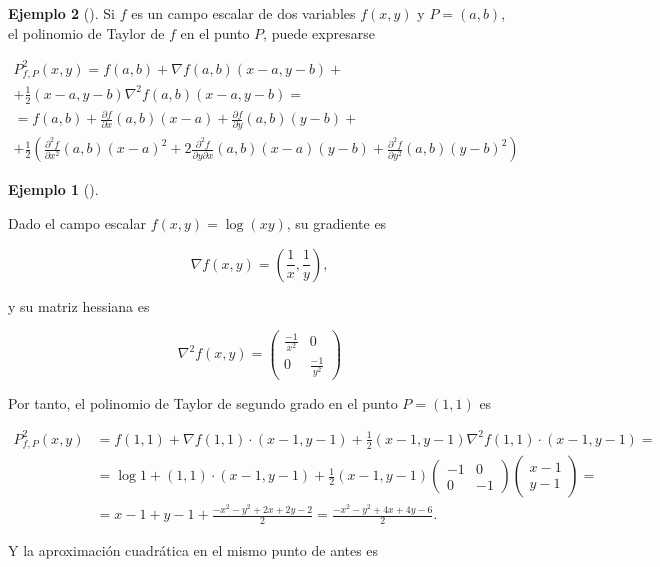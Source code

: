 \documentclass[
  a4paper,
]{scrreport}
\theoremstyle{definition}
\newtheorem{example}{Ejemplo}[chapter]
\theoremstyle{plain}
\theoremstyle{definition}
\theoremstyle{definition}
\theoremstyle{plain}
\theoremstyle{plain}
\theoremstyle{remark}
\begin{document}
\begin{example}[]
Si \(f\) es un campo escalar de dos variables \(f(x,y)\) y \(P=(a, b)\),
el polinomio de Taylor de \(f\) en el punto \(P\), puede expresarse

\[
\begin{gathered}
P^2_{f,P}(x,y) = f(a,b)+\nabla f(a,b)(x-a,y-b) +\\
+\frac{1}{2}(x-a,y-b)\nabla^2f(a,b)(x-a,y-b)= \\
= f(a,b)+\frac{\partial f}{\partial x}(a,b)(x-a)+\frac{\partial f}{\partial y}(a,b)(y-b)+\\
+\frac{1}{2}\left(\frac{\partial^2 f}{\partial x^2}(a,b) (x-a)^2 + 2\frac{\partial^2 f}{\partial y\partial x}(a,b) (x-a)(y-b) + \frac{\partial^2 f}{\partial y^2}(a,b) (y-b)^2\right)
\end{gathered}
\]

\begin{example}[]\protect\hypertarget{exm-polinomio-taylor-funcion-varias-variables}{}\label{exm-polinomio-taylor-funcion-varias-variables}

Dado el campo escalar \(f(x,y)=\log(xy)\), su gradiente es

\[
\nabla f(x,y) = \left(\frac{1}{x},\frac{1}{y}\right),
\]

y su matriz hessiana es

\[
\nabla ^2 f(x,y) 
= \left(
\begin{array}{cc}
\frac{-1}{x^2} & 0\\
0 & \frac{-1}{y^2}
\end{array}
\right)
\]

Por tanto, el polinomio de Taylor de segundo grado en el punto
\(P=(1,1)\) es

\begin{align*}
P^2_{f,P}(x,y) &= f(1,1) +\nabla f(1,1)\cdot (x-1,y-1) + \frac{1}{2}(x-1,y-1)\nabla^2f(1,1)\cdot(x-1,y-1)=\\
&= \log 1+(1,1)\cdot(x-1,y-1) + \frac{1}{2}(x-1,y-1)
\left(
\begin{array}{cc}
-1 & 0\\
0 & -1
\end{array}
\right)
\left(
\begin{array}{c}
x-1\\
y-1
\end{array}
\right)
= \\
&= x-1+y-1+\frac{-x^2-y^2+2x+2y-2}{2} = \frac{-x^2-y^2+4x+4y-6}{2}.
\end{align*}

Y la aproximación cuadrática en el mismo punto de antes es


\end{example}
\end{example}
\end{document}
